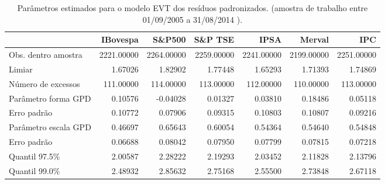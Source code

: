 \begin{table}[H]
\centering
\caption{Parâmetros estimados para o modelo EVT dos resíduos padronizados. 
               (amostra de trabalho entre 01/09/2005 a 31/08/2014 ).} 
\label{tab:evtcoef}
\begin{tabular}{lrrrrrr}
  \hline
 & IBovespa & S\&P500 & S\&P TSE & IPSA & Merval & IPC \\ 
  \hline
Obs. dentro amostra & 2221.00000 & 2264.00000 & 2259.00000 & 2241.00000 & 2199.00000 & 2251.00000 \\ 
  Limiar & 1.67026 & 1.82902 & 1.77448 & 1.65293 & 1.71393 & 1.74869 \\ 
  Número de excessos & 111.00000 & 114.00000 & 113.00000 & 112.00000 & 110.00000 & 113.00000 \\ 
  Parâmetro forma GPD & 0.10576 & -0.04028 & 0.01327 & 0.03810 & 0.18486 & 0.05118 \\ 
  Erro padrão & 0.10772 & 0.07906 & 0.09315 & 0.10803 & 0.10807 & 0.09216 \\ 
  Parâmetro escala GPD & 0.46697 & 0.65643 & 0.60054 & 0.54364 & 0.54640 & 0.54848 \\ 
  Erro padrão & 0.06688 & 0.08042 & 0.07950 & 0.07799 & 0.07815 & 0.07218 \\ 
  Quantil 97.5\% & 2.00587 & 2.28222 & 2.19293 & 2.03452 & 2.11828 & 2.13796 \\ 
  Quantil 99.0\% & 2.48932 & 2.85632 & 2.75168 & 2.55500 & 2.73848 & 2.67118 \\ 
   \hline
\end{tabular}
\end{table}
